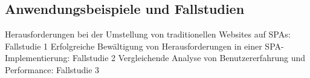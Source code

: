 \subsection{Anwendungsbeispiele und Fallstudien}
Herausforderungen bei der Umstellung von traditionellen Websites auf SPAs: Fallstudie 1
Erfolgreiche Bewältigung von Herausforderungen in einer SPA-Implementierung: Fallstudie 2
Vergleichende Analyse von Benutzererfahrung und Performance: Fallstudie 3